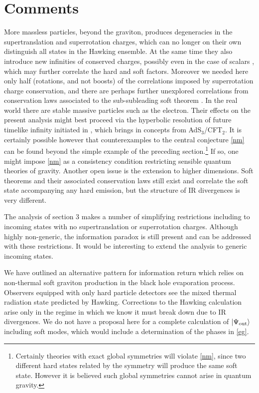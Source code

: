 \documentclass[12pt]{article}
\numberwithin{equation}{section}
\def\>{\rangle }
\begin{document}
\section{Comments}

More massless particles, beyond the graviton,  produces degeneracies in the supertranslation and superrotation charges, which can no longer on their own distinguish all states in the Hawking ensemble. At the same time they also introduce new infinities of conserved charges, possibly even in the case of scalars \cite{Campiglia:2017dpg}, which may further correlate the hard and soft factors. Moreover we needed here only half (rotations, and not boosts) of the correlations imposed by superrotation charge conservation, and there are perhaps further unexplored correlations from conservation laws associated to the sub-subleading soft theorem \cite{Cachazo:2014fwa,Campiglia:2016jdj,Campiglia:2016efb,Conde:2016rom,Laddha:2017ygw}.
In the real world there are stable massive particles such as the electron. Their effects on the present analysis might best proceed via the hyperbolic resolution of future timelike infinity
initiated in \cite{Campiglia:2015qka}, which brings in concepts from AdS$_3$/CFT$_2$. 
It is certainly possible however that counterexamples to the central conjecture \eqref{nm} can be found beyond the simple example of the preceding section.\footnote{Certainly theories with exact global symmetries will violate \eqref{nm}, since two different hard states related by the symmetry will produce the same soft state. However it is believed such global symmetries  cannot arise  in quantum gravity.}  If so, one might impose \eqref{nm} as a consistency condition restricting sensible quantum theories of gravity. 
Another open issue is the extension to higher dimensions.  Soft theorems and their associated  conservation laws still exist and correlate the soft state accompanying any hard emission, but the structure of IR divergences is very different.

The analysis of section 3 makes a number of simplifying restrictions including to  incoming states with no  supertranslation or superrotation charges. Although highly non-generic, the information paradox is still present and can be addressed with these restrictions. It would be interesting  to extend the analysis to generic incoming states. 

We have outlined an alternative  pattern for information return 
which relies on non-thermal soft graviton production in the black hole evaporation process. Observers equipped with only hard particle detectors see the mixed thermal radiation state predicted by Hawking.  Corrections to the Hawking calculation arise only  in the regime in which we know it must break down due to IR divergences. We do not have a proposal here for a complete calculation of $|\Psi_{\rm out} \>$ including soft modes, which would  include a determination of  the phases in  \eqref{eg}. 
\end{document}
